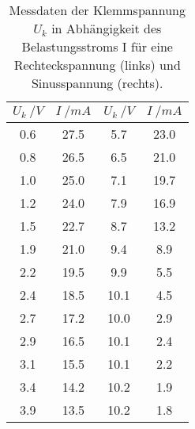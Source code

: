 \begin{table}[H]
  \centering
   \begin{tabular}{c c c c}
    \toprule
    $ U_{k} \: /V $ & $ I \: /mA $ & $ U_{k} \: /V $ & $ I \: /mA $ \\
    \midrule
    0.6 & 27.5 & 5.7 & 23.0 \\
    0.8 & 26.5 & 6.5 & 21.0\\
    1.0 & 25.0 & 7.1 & 19.7\\
    1.2 & 24.0 & 7.9 & 16.9\\
    1.5 & 22.7 & 8.7 & 13.2\\
    1.9 & 21.0 & 9.4 & 8.9\\
    2.2 & 19.5 & 9.9 & 5.5 \\
    2.4 & 18.5 & 10.1 & 4.5\\
    2.7 & 17.2 & 10.0 & 2.9\\
    2.9 & 16.5 & 10.1 & 2.4\\
    3.1 & 15.5 & 10.1 & 2.2 \\
    3.4 & 14.2 & 10.2 & 1.9\\
    3.9 & 13.5 & 10.2 & 1.8\\
    \bottomrule
  \end{tabular}
  \caption{Messdaten der Klemmspannung $U_{k}$ in Abhängigkeit des Belastungsstroms I für eine
   Rechteckspannung (links) und Sinusspannung (rechts).}
  \label{tab:tabelle3}
\end{table}
